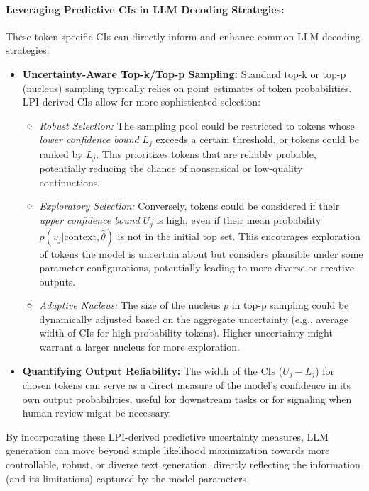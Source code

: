 \documentclass[11pt]{article}
\begin{document}
\paragraph{Leveraging Predictive CIs in LLM Decoding Strategies:}
These token-specific CIs can directly inform and enhance common LLM decoding strategies:
\begin{itemize}
    \item \textbf{Uncertainty-Aware Top-k/Top-p Sampling:} Standard top-k or top-p (nucleus) sampling \cite{holtzman2019curious} typically relies on point estimates of token probabilities. LPI-derived CIs allow for more sophisticated selection:
    \begin{itemize}
        \item \textit{Robust Selection:} The sampling pool could be restricted to tokens whose \textit{lower confidence bound} $L_j$ exceeds a certain threshold, or tokens could be ranked by $L_j$. This prioritizes tokens that are reliably probable, potentially reducing the chance of nonsensical or low-quality continuations.
        \item \textit{Exploratory Selection:} Conversely, tokens could be considered if their \textit{upper confidence bound} $U_j$ is high, even if their mean probability $p(v_j | \text{context}, \hat{\theta})$ is not in the initial top set. This encourages exploration of tokens the model is uncertain about but considers plausible under some parameter configurations, potentially leading to more diverse or creative outputs.
        \item \textit{Adaptive Nucleus:} The size of the nucleus $p$ in top-p sampling could be dynamically adjusted based on the aggregate uncertainty (e.g., average width of CIs for high-probability tokens). Higher uncertainty might warrant a larger nucleus for more exploration.
    \end{itemize}
    \item \textbf{Quantifying Output Reliability:} The width of the CIs ($U_j - L_j$) for chosen tokens can serve as a direct measure of the model's confidence in its own output probabilities, useful for downstream tasks or for signaling when human review might be necessary.
\end{itemize}
By incorporating these LPI-derived predictive uncertainty measures, LLM generation can move beyond simple likelihood maximization towards more controllable, robust, or diverse text generation, directly reflecting the information (and its limitations) captured by the model parameters.
\end{document}

